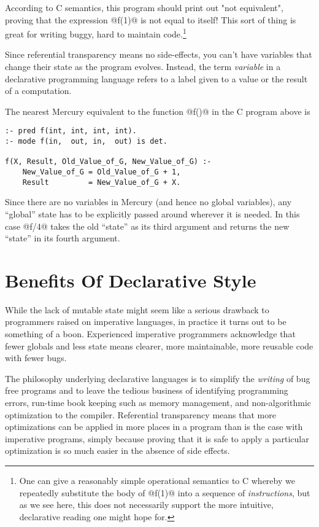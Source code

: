According to C semantics, this program should print out "not
equivalent", proving that the expression @f(1)@ is not equal to
itself!  This sort of thing is great for writing buggy, hard to
maintain code.\footnote{One can give a reasonably simple
operational semantics to C whereby we repeatedly substitute the
body of @f(1)@ into a sequence of \emph{instructions}, but as we
see here, this does not necessarily support the more intuitive,
declarative reading one might hope for.}

Since referential transparency means no side-effects, you can't have
variables that change their state as the program evolves.  Instead, the
term \emph{variable} in a declarative programming language refers to a
label given to a value or the result of a computation.

The nearest Mercury equivalent to the function @f()@ in the C
program above is

\begin{verbatim}
:- pred f(int, int, int, int).
:- mode f(in,  out, in,  out) is det.

f(X, Result, Old_Value_of_G, New_Value_of_G) :-
    New_Value_of_G = Old_Value_of_G + 1,
    Result         = New_Value_of_G + X.
\end{verbatim}

Since there are no variables in Mercury (and hence no global
variables), any ``global'' state has to be explicitly passed
around wherever it is needed.  In this case @f/4@ takes the old
``state'' as its third argument and returns the new ``state'' in
its fourth argument.

\section{Benefits Of Declarative Style}

While the lack of mutable state might seem like a serious
drawback to programmers raised on imperative languages, in
practice it turns out to be something of a boon.  Experienced
imperative programmers acknowledge that fewer globals and less
state means clearer, more maintainable, more reusable code
with fewer bugs.

The philosophy underlying declarative languages is to simplify the
\emph{writing} of bug free programs and to leave the tedious
business of identifying programming errors, run-time book
keeping such as memory management, and non-algorithmic
optimization to the compiler.  Referential transparency means
that more optimizations can be applied in more places in a
program than is the case with imperative programs, simply
because proving that it is safe to apply a particular
optimization is so much easier in the absence of side effects.

